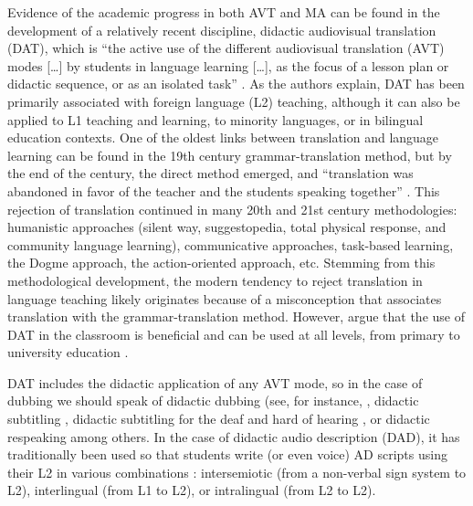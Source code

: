 \documentclass[english]{textolivre}
\begin{document}
Evidence of the academic progress in both AVT and MA can be found in the development of a relatively recent discipline, didactic audiovisual translation (DAT), which is “the active use of the different audiovisual translation (AVT) modes […] by students in language learning […], as the focus of a lesson plan or didactic sequence, or as an isolated task” \cite[p. 1]{talavan_lertola_fernandez-costales2024}. As the authors explain, DAT has been primarily associated with foreign language (L2) teaching, although it can also be applied to L1 teaching and learning, to minority languages, or in bilingual education contexts. One of the oldest links between translation and language learning can be found in the 19th century grammar-translation method, but by the end of the century, the direct method emerged, and “translation was abandoned in favor of the teacher and the students speaking together” \cite[p. 56]{harmer2019}. This rejection of translation continued in many 20th and 21st century methodologies: humanistic approaches (silent way, suggestopedia, total physical response, and community language learning), communicative approaches, task-based learning, the Dogme approach, the action-oriented approach, etc. Stemming from this methodological development, the modern tendency to reject translation in language teaching likely originates because of a misconception that associates translation with the grammar-translation method. However, \textcite{talavan_lertola_fernandez-costales2024} argue that the use of DAT in the classroom is beneficial and can be used at all levels, from primary to university education \cite{talavan_lertola_fernandez-costales2024}.

DAT includes the didactic application of any AVT mode, so in the case of dubbing we should speak of didactic dubbing (see, for instance, \textcite{navarrete2013,talavan2013,talavan_costal2017,sanchez-requena2018}, didactic subtitling \cite{borghetti2014,vanderplank2016,fernandez-costales2017,avila-cabrera2018,diaz-cintas2018a,sokoli2018,talavan2020}, didactic subtitling for the deaf and hard of hearing \cite{agullo2019, talavan2019, garcia-munoz_vizcaino2024}, or didactic respeaking \cite{belenguer-cortes2024} among others. In the case of didactic audio description (DAD), it has traditionally been used so that students write (or even voice) AD scripts using their L2 in various combinations \cite{talavan_lertola_fernandez-costales2024}: intersemiotic (from a non-verbal sign system to L2), interlingual (from L1 to L2), or intralingual (from L2 to L2). 
\end{document}
